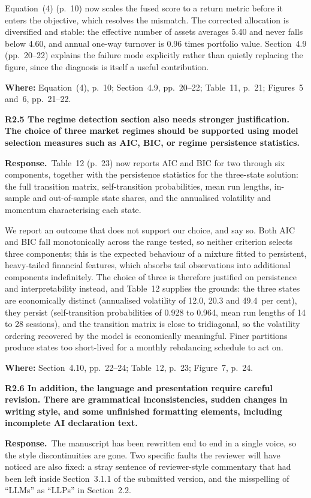 \documentclass[11pt,a4paper]{article}
\newcommand{\rc}[1]{\par\medskip\noindent\textbf{#1}\par\nopagebreak}
\newcommand{\resp}{\par\noindent\textbf{Response.}\ }
\newcommand{\where}[1]{\par\smallskip\noindent\textcolor{blue!55!black}{\textbf{Where:} #1}\par}
\begin{document}
Equation~(4) (p.~10) now scales the fused score to a return metric before it enters the
objective, which resolves the mismatch. The corrected allocation is diversified and
stable: the effective number of assets averages 5.40 and never falls below 4.60, and
annual one-way turnover is 0.96 times portfolio value. Section~4.9 (pp.~20--22) explains
the failure mode explicitly rather than quietly replacing the figure, since the
diagnosis is itself a useful contribution.
\where{Equation~(4), p.~10; Section~4.9, pp.~20--22; Table~11, p.~21; Figures~5 and~6,
pp.~21--22.}

\rc{R2.5 The regime detection section also needs stronger justification. The choice of
three market regimes should be supported using model selection measures such as AIC,
BIC, or regime persistence statistics.}

\resp Table~12 (p.~23) now reports AIC and BIC for two through six components, together
with the persistence statistics for the three-state solution: the full transition
matrix, self-transition probabilities, mean run lengths, in-sample and out-of-sample
state shares, and the annualised volatility and momentum characterising each state.

We report an outcome that does not support our choice, and say so. Both AIC and BIC fall
monotonically across the range tested, so neither criterion selects three components;
this is the expected behaviour of a mixture fitted to persistent, heavy-tailed financial
features, which absorbs tail observations into additional components indefinitely. The
choice of three is therefore justified on persistence and interpretability instead, and
Table~12 supplies the grounds: the three states are economically distinct (annualised
volatility of 12.0, 20.3 and 49.4~per cent), they persist (self-transition probabilities
of 0.928 to 0.964, mean run lengths of 14 to 28 sessions), and the transition matrix is
close to tridiagonal, so the volatility ordering recovered by the model is economically
meaningful. Finer partitions produce states too short-lived for a monthly rebalancing
schedule to act on.
\where{Section~4.10, pp.~22--24; Table~12, p.~23; Figure~7, p.~24.}

\rc{R2.6 In addition, the language and presentation require careful revision. There are
grammatical inconsistencies, sudden changes in writing style, and some unfinished
formatting elements, including incomplete AI declaration text.}

\resp The manuscript has been rewritten end to end in a single voice, so the style
discontinuities are gone. Two specific faults the reviewer will have noticed are also
fixed: a stray sentence of reviewer-style commentary that had been left inside
Section~3.1.1 of the submitted version, and the misspelling of ``LLMs'' as ``LLPs'' in
Section~2.2.
\end{document}
